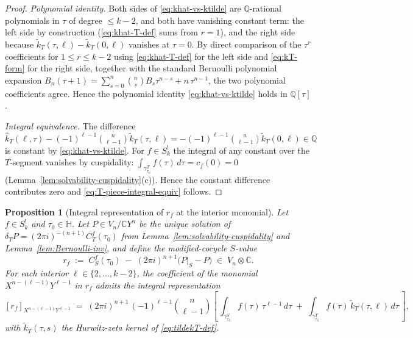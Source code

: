 \documentclass[11pt]{article}
\newtheorem{proposition}[theorem]{Proposition}
\numberwithin{equation}{section}  %
\newcommand{\HH}{\mathbb{H}}
\newcommand{\QQ}{\mathbb{Q}}
\newcommand{\CC}{\mathbb{C}}
\begin{document}
\begin{proof}
\emph{Polynomial identity.}  Both sides of \eqref{eq:khat-vs-ktilde}
are $\QQ$-rational polynomials in $\tau$ of degree $\le k - 2$, and
both have vanishing constant term: the left side by construction
(\eqref{eq:khat-T-def} sums from $r = 1$), and the right side because
$\widetilde{k}_T(\tau, \ell) - \widetilde{k}_T(0, \ell)$ vanishes at $\tau = 0$.
By direct comparison of the $\tau^r$ coefficients for $1 \le r \le k - 2$
using \eqref{eq:khat-T-def} for the left side and \eqref{eq:kT-form}
for the right side, together with the standard Bernoulli polynomial
expansion $B_n(\tau + 1) = \sum_{s = 0}^{n}\binom{n}{s} B_s \tau^{n - s} + n\,\tau^{n - 1}$,
the two polynomial coefficients agree.  Hence the polynomial identity
\eqref{eq:khat-vs-ktilde} holds in $\QQ[\tau]$.

\emph{Integral equivalence.}  The difference $\widehat{k}_T(\ell, \tau) -
(-1)^{\ell - 1}\binom{n}{\ell - 1}\widetilde{k}_T(\tau, \ell) = -(-1)^{\ell - 1}\binom{n}{\ell - 1}\widetilde{k}_T(0, \ell) \in \QQ$
is constant by \eqref{eq:khat-vs-ktilde}.  For $f \in S^!_k$ the
integral of any constant over the $T$-segment vanishes by cuspidality:
$\int_{\gamma^T_{\tau_0}}\! f(\tau)\,d\tau = c_f(0) = 0$
(Lemma~\ref{lem:solvability-cuspidality}(c)).  Hence the constant
difference contributes zero and \eqref{eq:T-piece-integral-equiv}
follows.
\end{proof}

\begin{proposition}[Integral representation of $r_f$ at the interior monomial]\label{prop:kernels}
Let $f \in S^!_k$ and $\tau_0 \in \HH$.  Let $P \in V_n / \CC Y^n$ be the
unique solution of $\delta_T P = (2\pi i)^{-(n + 1)} C^f_T(\tau_0)$
from Lemma~\ref{lem:solvability-cuspidality} and
Lemma~\ref{lem:Bernoulli-inv}, and define the modified-cocycle
$S$-value
\begin{equation}\label{eq:rf-def}
  r_f \;:=\; C^f_S(\tau_0) \;-\; (2\pi i)^{n+1}\bigl(P|_S - P\bigr)
  \;\in\; V_n \otimes \CC.
\end{equation}
For each interior $\ell \in \{2, \ldots, k - 2\}$, the coefficient of the
monomial $X^{n - (\ell - 1)} Y^{\ell - 1}$ in $r_f$ admits the integral
representation
\begin{equation}\label{eq:rf-coeff-integral}
  [r_f]_{X^{n - (\ell - 1)} Y^{\ell - 1}}
  \;=\; (2\pi i)^{n + 1}\,(-1)^{\ell - 1}\binom{n}{\ell - 1}\!
  \left[\,\int_{\gamma^S_{\tau_0}}\! f(\tau)\,\tau^{\ell - 1}\,d\tau
        \;+\; \int_{\gamma^T_{\tau_0}}\! f(\tau)\,\widetilde{k}_T(\tau, \ell)\,d\tau\,\right],
\end{equation}
with $\widetilde{k}_T(\tau, s)$ the Hurwitz-zeta kernel of
\eqref{eq:tildekT-def}.
\end{proposition}
\end{document}
